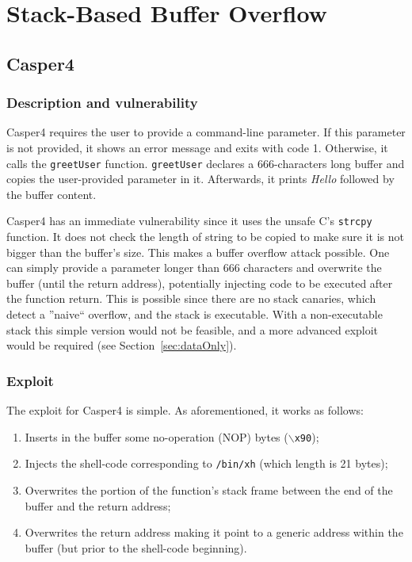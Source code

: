 \section{Stack-Based Buffer Overflow}
\subsection{Casper4}
\subsubsection{Description and vulnerability}
Casper4 requires the user to provide a command-line parameter. If this parameter is not provided, it shows an error message and exits with code 1. Otherwise, it calls the \texttt{greetUser} function. \texttt{greetUser} declares a 666-characters long buffer and copies the user-provided parameter in it. Afterwards, it prints \textit{Hello} followed by the buffer content.

Casper4 has an immediate vulnerability since it uses the unsafe C's \texttt{strcpy} function. It does not check the length of string to be copied to make sure it is not bigger than the buffer's size. This makes a buffer overflow attack possible. One can simply provide a parameter longer than 666 characters and overwrite the buffer (until the return address), potentially injecting code to be executed after the function return. This is possible since there are no stack canaries, which detect a ''naive`` overflow, and the stack is executable. With a non-executable stack this simple version would not be feasible, and a more advanced exploit would be required (see Section~\ref{sec:dataOnly}).

\subsubsection{Exploit}
The exploit for Casper4 is simple. As aforementioned, it works as follows:
\begin{enumerate}
	\item Inserts in the buffer some no-operation (NOP) bytes (\texttt{$\backslash$x90});
	\item Injects the shell-code corresponding to \texttt{/bin/xh} (which length is 21 bytes);
	\item Overwrites the portion of the function's stack frame between the end of the buffer and the return address;
	\item Overwrites the return address making it point to a generic address within the buffer (but prior to the shell-code beginning).
\end{enumerate}


